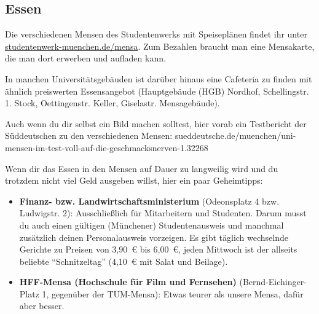 \subsection{Essen}

Die verschiedenen Mensen des Studentenwerks mit Speiseplänen findet ihr unter\\ \url{studentenwerk-muenchen.de/mensa}. Zum Bezahlen braucht man eine Mensakarte, die man dort erwerben und aufladen kann.

In manchen Universitätsgebäuden ist darüber hinaus eine Cafeteria zu finden mit ähnlich preiswerten Essensangebot (Hauptgebäude (HGB) Nordhof, Schellingstr. 1. Stock, Oettingenstr. Keller, Giselastr. Mensagebäude).

Auch wenn du dir selbst ein Bild machen solltest, hier vorab ein Testbericht der Süddeutschen zu den verschiedenen Mensen:
sueddeutsche.de/muenchen/uni-mensen-im-test-\newline voll-auf-die-geschmacksnerven-1.32268

Wenn dir das Essen in den Mensen auf Dauer zu langweilig wird und du trotzdem nicht viel Geld ausgeben willst, hier ein paar Geheimtipps:

\begin{itemize}
	\item \textbf{Finanz- bzw. Landwirtschaftsministerium} (Odeonsplatz 4 bzw. Ludwigstr. 2): Ausschließlich für Mitarbeitern und Studenten. Darum musst du auch einen gültigen (Münchener) Studentenausweis und manchmal zusätzlich deinen Personalausweis vorzeigen. Es gibt täglich wechselnde Gerichte zu Preisen von 3,90~€ bis 6,00~€, jeden Mittwoch ist der allseits beliebte “Schnitzeltag” (4,10~€ mit Salat und Beilage).

	\item \textbf{HFF-Mensa (Hochschule für Film und Fernsehen)}
          (Bernd-Eichinger-Platz 1, gegenüber der TUM-Mensa): Etwas
          teurer als unsere Mensa, dafür aber besser.
\end{itemize}
